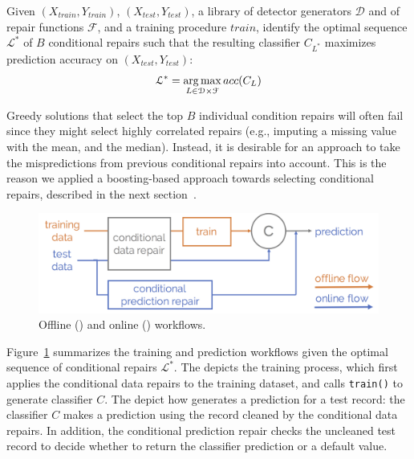 \begin{problem}\sloppy
Given $(X_{train}, Y_{train})$, $(X_{test}, Y_{test})$, a library of detector generators $\mathcal{D}$ and of repair functions $\mathcal{F}$, and a training procedure $train$, identify the optimal sequence $\mathcal{L}^*$ of $B$ conditional repairs such that the resulting classifier $C_{L^*}$  maximizes prediction accuracy on $(X_{test}, Y_{test})$:
$$\mathcal{L}^* = \operatorname*{arg\,max}_{L \in \mathcal{D}\times\mathcal{F}} acc(C_L)$$
\end{problem}

Greedy solutions that select the top $B$ individual condition repairs will often fail since they might select highly correlated repairs (e.g., imputing a missing value with the mean, and the median).
Instead, it is desirable for an approach to take the mispredictions from previous conditional repairs into account.  This is the reason we applied a boosting-based approach towards selecting conditional repairs, described in the next section~\cite{schapire2003boosting}.

\begin{figure}\centering
\includegraphics[width=\columnwidth]{figures/workflow.png}
\caption{Offline () and online () workflows.}
\label{fig:workflow}
\end{figure}

Figure~\ref{fig:workflow} summarizes the training and prediction workflows given the optimal sequence of conditional repairs $\mathcal{L}^*$.  The  depicts the training process, which first applies the conditional data repairs to the training dataset, and calls \texttt{train()} to generate classifier $C$.  The  depict how \sys generates a prediction for a test record: the classifier $C$ makes a prediction using the record cleaned by the conditional data repairs.  In addition, the conditional prediction repair checks the uncleaned test record to decide whether to return the classifier prediction or a default value.


